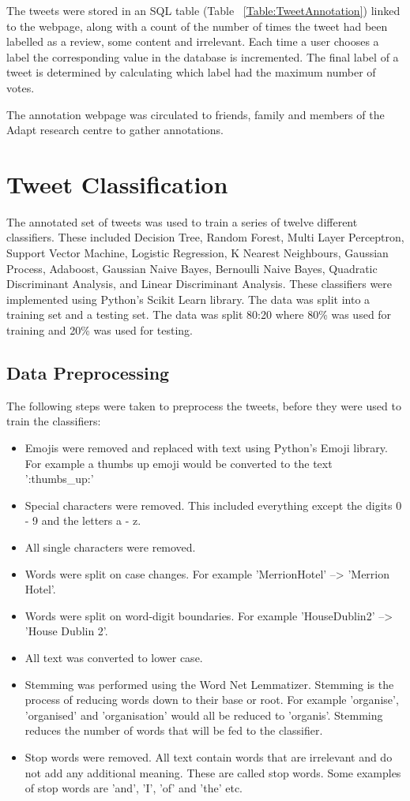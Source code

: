 The tweets were stored in an SQL table (Table ~\ref{Table:TweetAnnotation}) linked to the webpage, along with a count of the number of times the tweet had been labelled as a review, some content and irrelevant. Each time a user chooses a label the corresponding value in the database is incremented. The final label of a tweet is determined by calculating which label had the maximum number of votes. 

The annotation webpage was circulated to friends, family and members of the Adapt research centre to gather annotations.

\section{Tweet Classification}

The annotated set of tweets was used to train a series of twelve different classifiers. These included Decision Tree, Random Forest, Multi Layer Perceptron, Support Vector Machine, Logistic Regression, K Nearest Neighbours, Gaussian Process, Adaboost, Gaussian Naive Bayes, Bernoulli Naive Bayes, Quadratic Discriminant Analysis, and Linear Discriminant Analysis. These classifiers were implemented using Python's Scikit Learn library. The data was split into a training set and a testing set. The data was split 80:20 where 80\% was used for training and 20\% was used for testing.

\subsection*{Data Preprocessing}

The following steps were taken to preprocess the tweets, before they were used to train the classifiers:
\begin{itemize}
    \item Emojis were removed and replaced with text using Python's Emoji library. For example a thumbs up emoji would be converted to the text ':thumbs\_up:'
    \item Special characters were removed. This included everything except the digits 0 - 9 and the letters a - z.
    \item All single characters were removed.
    \item Words were split on case changes. For example 'MerrionHotel' --> 'Merrion Hotel'.
    \item Words were split on word-digit boundaries. For example 'HouseDublin2' --> 'House Dublin 2'.
    \item All text was converted to lower case.
    \item Stemming was performed using the Word Net Lemmatizer. Stemming is the process of reducing words down to their base or root. For example 'organise', 'organised' and 'organisation' would all be reduced to 'organis'. Stemming reduces the number of words that will be fed to the classifier.
    \item Stop words were removed. All text contain words that are irrelevant and do not add any additional meaning. These are called stop words. Some examples of stop words are 'and', 'I', 'of' and 'the' etc.
\end{itemize}

